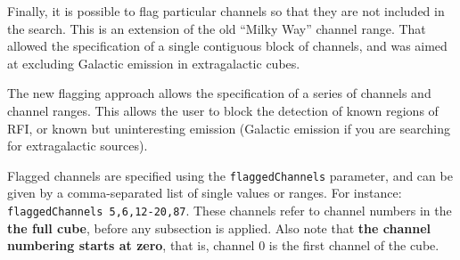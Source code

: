 %
%
%
%
%

\label{sec-flagging}

Finally, it is possible to flag particular channels so that they are
not included in the search. This is an extension of the old ``Milky
Way'' channel range. That allowed the specification of a single
contiguous block of channels, and was aimed at excluding Galactic
emission in extragalactic \hi cubes. 

The new flagging approach allows the specification of a series of
channels and channel ranges. This allows the user to block the
detection of known regions of RFI, or known but uninteresting emission
(\eg Galactic \hi emission if you are searching for extragalactic
sources). 

Flagged channels are specified using the \texttt{flaggedChannels}
parameter, and can be given by a comma-separated list of single values
or ranges. For instance: \texttt{flaggedChannels  5,6,12-20,87}. These
channels refer to channel numbers in the \textbf{the full cube},
before any subsection is applied. Also note that \textbf{the channel
  numbering starts at zero}, that is, channel 0 is the first channel
of the cube. 

